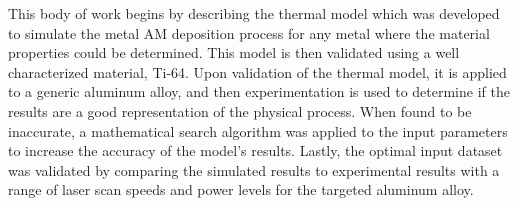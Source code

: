 \label{methodsOverview}

This body of work begins by describing the thermal model which was developed to simulate the metal \ac{AM} deposition process for any metal where the material properties could be determined.  This model is then validated using a well characterized material, Ti-64.  Upon validation of the thermal model, it is applied to a generic aluminum alloy, and then experimentation is used to determine if the results are a good representation of the physical process.  When found to be inaccurate, a mathematical search algorithm was applied to the input parameters to increase the accuracy of the model's results.  Lastly, the optimal input dataset was validated by comparing the simulated results to experimental results with a range of laser scan speeds and power levels for the targeted aluminum alloy.
